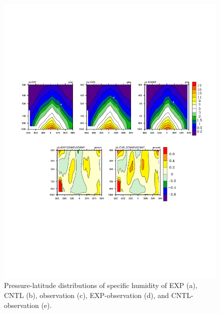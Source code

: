 \documentclass[gmd, manuscript]{copernicus}
\begin{document}
\begin{figure}[t]
\includegraphics[width=15.3cm]{shum}
\caption{Pressure-latitude distributions of specific humidity of EXP (a), CNTL (b), observation (c), EXP-observation (d), and CNTL-observation (e).}
\end{figure}
\end{document}
